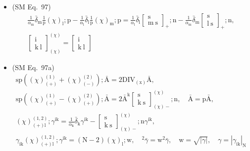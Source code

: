 \documentclass[
    12pt,              %
    a4paper,           %
    headings=normal,   %
    twoside=true,      %
    BCOR=8mm,          %
]{scrbook}
\begin{document}
\begin{itemize}[label={},leftmargin=0pt]
    \item (SM Eq.\ 97) 
    \[
    \begin{gathered}
    \frac{1}{\alpha_\mathrm{m}}\bar{\delta}_\mathrm{m} \frac{1}{\mathrm{p}}(\chi)_\mathrm{l};\mathrm{p} - \frac{1}{\alpha_\mathrm{l}}\bar{\delta}_\mathrm{l} \frac{1}{\mathrm{p}}(\chi)_\mathrm{m};\mathrm{p} = \frac{1}{\alpha_\mathrm{l}}\bar{\delta}_\mathrm{l} \left[ \begin{smallmatrix} \mathrm{s} \\ \mathrm{m}\ \mathrm{s} \end{smallmatrix} \right]_+;\mathrm{n} - \frac{1}{\alpha_\mathrm{m}}\bar{\delta}_\mathrm{m} \left[ \begin{smallmatrix} \mathrm{s} \\ \mathrm{l}\ \mathrm{s} \end{smallmatrix} \right]_+;\mathrm{n}, \\
    \left[ \begin{smallmatrix} \mathrm{i} \\ \mathrm{k}\ \mathrm{l} \end{smallmatrix} \right]^{(\chi)}_{(\chi)} = \left[ \begin{smallmatrix} \mathrm{i} \\ \mathrm{k}\ \mathrm{l} \end{smallmatrix} \right]
    \end{gathered}
    \]

    \item (SM Eq.\ 97a) 
    \[
    \begin{gathered}
    \mathrm{sp}\left((\chi)^{(1)}_{(+)} + (\chi)^{(2)}_{(-)}\right); \bar{\mathrm{A}} = 2\mathrm{DIV}_{(\mathrm{x})}\bar{\mathrm{A}}, \\
    \mathrm{sp}\left((\chi)^{(1)}_{(+)} - (\chi)^{(2)}_{(+)}\right); \bar{\mathrm{A}} = 2\bar{\mathrm{A}}^\mathrm{k} \left[ \begin{smallmatrix} \mathrm{s} \\ \mathrm{k\ s} \end{smallmatrix} \right]^{(\chi)}_{(\chi)-}; \mathrm{n}, \quad \bar{\mathrm{A}} = \mathrm{p}\bar{\mathrm{A}}, \\
    (\chi)^{(1,2)}_{(+)\mathrm{l}} ; \gamma^{\mathrm{ik}} = \frac{1}{\alpha_\mathrm{k}}\bar{\delta}_\mathrm{k} \gamma^{\mathrm{ik}} - \left[ \begin{smallmatrix} \mathrm{s} \\ \mathrm{k\ s} \end{smallmatrix} \right]^{(\chi)}_{(\chi)-}; \mathrm{n} \gamma^{\mathrm{ik}}, \\
    \gamma_{\mathrm{ik}}(\chi)^{(1,2)}_{(+)\mathrm{l}} ; \gamma^{\mathrm{ik}} = (\mathrm{N}-2)(\chi)_\mathrm{l} ; \mathrm{w}, \quad {}^2\bar{\gamma} = \mathrm{w}^2 \bar{\gamma}, \quad \mathrm{w} = \sqrt{|\gamma|}, \quad \gamma = |\gamma_{\mathrm{ik}}|_\mathrm{N}
    \end{gathered}
    \]


\end{itemize}
\end{document}
